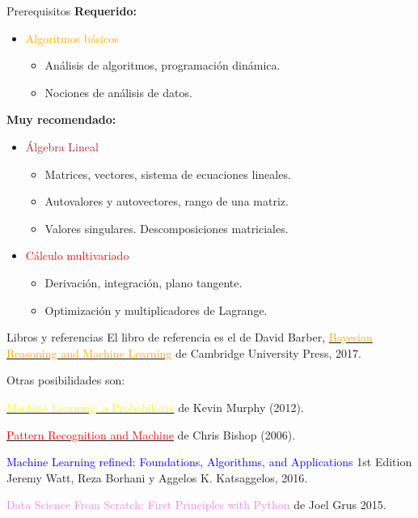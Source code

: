 \documentclass[11pt]{beamer}
\begin{document}
\begin{frame}{Prerequisitos}
\textbf{Requerido:}

\begin{itemize}
\item \textcolor{orange}{Algoritmos b\'asicos}
\begin{itemize}
	\item An\'alisis de algoritmos, programaci\'on din\'amica.
	\item Nociones de an\'alisis de datos.
\end{itemize}
\end{itemize}

\textbf{Muy recomendado:}
\begin{itemize}
\item \textcolor{brown}{\'Algebra Lineal}
\begin{itemize}
	\item Matrices, vectores, sistema de ecuaciones lineales.
	\item Autovalores y autovectores, rango de una matriz.
	\item Valores singulares. Descomposiciones matriciales.
\end{itemize}
\item \textcolor{red}{C\'alculo multivariado}
\begin{itemize}
	\item Derivaci\'on, integraci\'on, plano tangente.
	\item Optimizaci\'on y multiplicadores de Lagrange.
\end{itemize}
\end{itemize}
\end{frame}

\begin{frame}{Libros y referencias}
El libro de referencia es el de David Barber, \href{http://web4.cs.ucl.ac.uk/staff/D.Barber/pmwiki/pmwiki.php?n=Brml.Online}{\textcolor{orange}{Bayesian Reasoning and Machine Learning}} de Cambridge University Press, 2017.

\vspace{0.3cm}

Otras posibilidades son:

\begin{itemize}
	\small{
	\item \href{http://www.cs.ubc.ca/\%7Emurphyk/MLbook/index.html}{\textcolor{yellow}{Machine Learning: a Probabilistic}} de Kevin Murphy (2012).
	\item \href{http://research.microsoft.com/en-us/um/people/cmbishop/prml/}{\textcolor{red}{Pattern Recognition and Machine}} de Chris Bishop  (2006). 
	\item  \textcolor{blue}{Machine Learning refined: Foundations, Algorithms, and Applications} 1st Edition Jeremy Watt, Reza Borhani y Aggelos K. Katsaggelos, 2016.
	\item \textcolor{violet}{Data Science From Scratch: First Principles with Python} de Joel Grus 2015.
	}

\end{itemize}
\end{frame}
\end{document}
